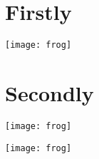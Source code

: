 \documentclass[9pt,lineno]{elife}
\begin{document}
\appendix
\begin{appendixbox}
\label{first:app}
\section{Firstly}
\lipsum[1]

\begin{center}
\texttt{[image: frog]}
\end{center}

\section{Secondly}

\lipsum[5-8]

\begin{center}
\texttt{[image: frog]}
\end{center}

\end{appendixbox}

\begin{appendixbox}
\texttt{[image: frog]}
\end{appendixbox}
\end{document}
